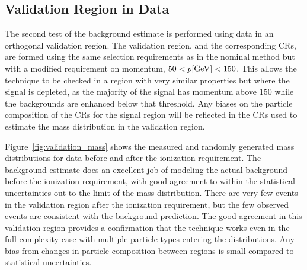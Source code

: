 \subsection{Validation Region in Data}
The second test of the background estimate is performed using data in an orthogonal validation region.
The validation region, and the corresponding \acp{CR}, are formed using the same selection requirements as in the nominal method but with a modified requirement on momentum, $50 < p [\mathrm{Ge\kern -0.05em V}] < 150$.
This allows the technique to be checked in a region with very similar properties but where the signal is depleted, as the majority of the signal has momentum above 150 \GeV while the backgrounds are enhanced below that threshold.
Any biases on the particle composition of the \acp{CR} for the signal region will be reflected in the \acp{CR} used to estimate the mass distribution in the validation region.


Figure~\ref{fig:validation_mass} shows the measured and randomly generated mass distributions for data before and after the ionization requirement.
The background estimate does an excellent job of modeling the actual background before the ionization requirement, with good agreement to within the statistical uncertainties out to the limit of the mass distribution.
There are very few events in the validation region after the ionization requirement, but the few observed events are consistent with the background prediction.
The good agreement in this validation region provides a confirmation that the technique works even in the full-complexity case with multiple particle types entering the distributions.
Any bias from changes in particle composition between regions is small compared to statistical uncertainties.


